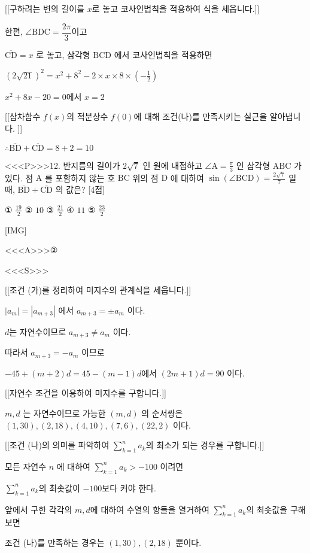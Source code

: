 \documentclass{oblivoir}
\begin{document}
[[구하려는 변의 길이를 $x$로 놓고 코사인법칙을 적용하여 식을 세웁니다.]]

한편, $ \angle \mathrm{BDC} = \dfrac{2\pi}{3}$이고

$\overline{\mathrm{CD}}=x$ 로 놓고, 삼각형 $\mathrm{BCD}$ 에서 코사인법칙을 적용하면

$ \left( 2 \sqrt{21} \right)^{2}=x^{2}+8^{2}-2 \times x \times 8 \times \left( -\frac{1}{2} \right)$

$x^{2}+8x-20=0$에서 $x=2$

[[삼차함수 $f(x)$의 적분상수 $f(0)$에 대해 조건(나)를 만족시키는 실근을 알아냅니다.  ]]

$\therefore \overline{\mathrm{BD}}+\overline{\mathrm{CD}}=8+2=10$


<<<P>>>12. 반지름의 길이가 $2 \sqrt{7}$ 인 원에 내접하고 $\angle \mathrm{A}=\frac{\pi}{3}$ 인 삼각형 $\mathrm{ABC}$ 가 있다. 점 $\mathrm{A}$ 를 포함하지 않는 호 $\mathrm{BC}$ 위의 점 $\mathrm{D}$ 에 대하여 $\sin (\angle \mathrm{BCD})=\frac{2 \sqrt{7}}{7}$ 일 때, $\overline{\mathrm{BD}}+\overline{\mathrm{CD}}$ 의 값은? [4점]

① $\frac{19}{2}$
② $10$
③ $\frac{21}{2}$
④ $11$
⑤ $\frac{23}{2}$

[IMG]

<<<A>>>②

<<<S>>>

[[조건 (가)를 정리하여 미지수의 관계식을 세웁니다.]]

$\left|a_{m}\right|=\left|a_{m+3}\right|$ 에서 $a_{m+3}=\pm a_{m}$ 이다.

$d$는 자연수이므로 $a_{m+3} \neq a_{m}$ 이다.

따라서 $a_{m+3}=-a_{m}$ 이므로

$-45+(m+2) d=45-(m-1) d$에서 $(2 m+1) d=90 $ 이다.

[[자연수 조건을 이용하여 미지수를 구합니다.]]

$m, d$ 는 자연수이므로 가능한 $(m, d)$ 의 순서쌍은 $(1,30),(2,18),(4,10),(7,6),(22,2)$ 이다.

[[조건 (나)의 의미를 파악하여 $\sum_{k=1}^{n} a_{k}$의 최소가 되는 경우를 구합니다.]]

모든 자연수 $n$ 에 대하여 $\sum_{k=1}^{n} a_{k}>-100$ 이려면 

$\sum_{k=1}^{n} a_{k}$의 최솟값이 $-100$보다 커야 한다.

앞에서 구한 각각의 $m,d$에 대하여 수열의 항들을 열거하여 $\sum_{k=1}^{n} a_{k}$의 최솟값을 구해보면

조건 (나)를 만족하는 경우는  $(1,30),(2,18)$ 뿐이다.
\end{document}
